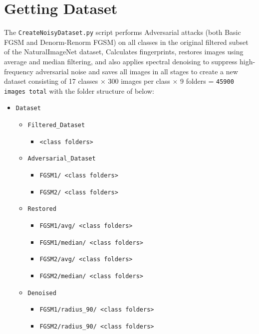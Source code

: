 \documentclass[a4paper,12pt]{report}%
\begin{document}
\section{Getting Dataset}
The \texttt{CreateNoisyDataset.py} script performs Adversarial attacks (both Basic FGSM and Denorm-Renorm FGSM) on all classes in the original filtered subset of the NaturalImageNet dataset, Calculates fingerprints, restores images using average and median filtering, and also applies spectral denoising to suppress high-frequency adversarial noise and saves all images in all stages to create a new dataset consisting of 17 classes × 300 images per class × 9 folders = \texttt{45900 images total} with the folder structure of below:
\begin{itemize}
    \item \texttt{Dataset}
    \begin{itemize}
        \item \texttt{Filtered\_Dataset}
        \begin{itemize}
            \item \texttt{<class folders>}
        \end{itemize}
        
        \item \texttt{Adversarial\_Dataset}
        \begin{itemize}
            \item \texttt{FGSM1/ <class folders>}
            \item \texttt{FGSM2/ <class folders>}
        \end{itemize}
        
        \item \texttt{Restored}
        \begin{itemize}
            \item \texttt{FGSM1/avg/ <class folders>}
            \item \texttt{FGSM1/median/ <class folders>}
            \item \texttt{FGSM2/avg/ <class folders>}
            \item \texttt{FGSM2/median/ <class folders>}
        \end{itemize}
        
        \item \texttt{Denoised}
        \begin{itemize}
            \item \texttt{FGSM1/radius\_90/ <class folders>}
            \item \texttt{FGSM2/radius\_90/ <class folders>}
        \end{itemize}
    \end{itemize}
\end{itemize}
\end{document}
